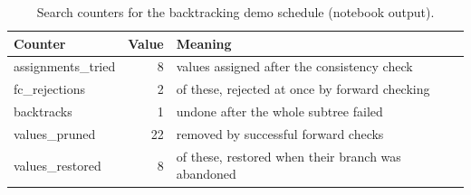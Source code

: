 \begin{table}[H]
\centering
\caption{Search counters for the backtracking demo schedule (notebook output).}
\label{tab:csp-demo}
\begin{tabular}{@{}lrl@{}}
\toprule
Counter & Value & Meaning \\
\midrule
assignments\_tried & 8 & values assigned after the consistency check \\
fc\_rejections & 2 & of these, rejected at once by forward checking \\
backtracks & 1 & undone after the whole subtree failed \\
values\_pruned & 22 & removed by successful forward checks \\
values\_restored & 8 & of these, restored when their branch was abandoned \\
\bottomrule
\end{tabular}
\end{table}

